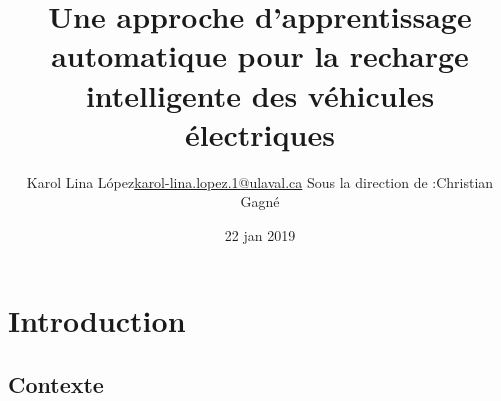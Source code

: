 \documentclass[french]{beamer}
\title[Recharge intelligente de VE]{Une approche d'apprentissage automatique pour la recharge intelligente des véhicules électriques}
\author[Karol Lina L\'opez]{\texorpdfstring{Karol Lina L\'opez\newline\href{mailto:karol-lina.lopez.1@ulaval.ca}{karol-lina.lopez.1@ulaval.ca}}{Karol Lina L\'opez} {\newline\newline\small Sous la direction de :\newline Christian Gagné \newline } }
\date{22 jan 2019} %
\begin{document}
{
\newcommand{\abs}[1]{\left\vert#1\right\vert}
\newcommand{\argmin}{\operatornamewithlimits{argmin}}
\newcommand{\argmax}{\operatornamewithlimits{argmax}}
\newcommand{\mean}{\operatornamewithlimits{mean}}

{
\begin{frame}
\titlepage %
\end{frame}
}
\addtocounter{framenumber}{-1}

% 

% 
% 
% 


\section{Introduction}
\subsection{Contexte}

}
\end{document}
